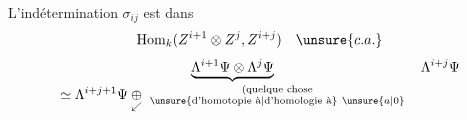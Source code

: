\margin{$\big]$}

L'indétermination  $\sigma_{ij}$ est dans
\[
\operatorname{Hom}_k(Z^{i+1}\otimes Z^j,Z^{i+j})\quad\unsure{c.a.}
\]
\[
\underbrace{\Lambda^{i+1}\Psi\otimes\Lambda^j\Psi}_
{\displaystyle\simeq\Lambda^{i+j+1}\Psi\underset{\swarrow}{\oplus}\ \substack{\text{(quelque chose}\\\text{\unsure{d'homotopie à|d'homologie à}}\ \unsure{a|0}}}
\quad\Lambda^{i+j}\Psi
\]

